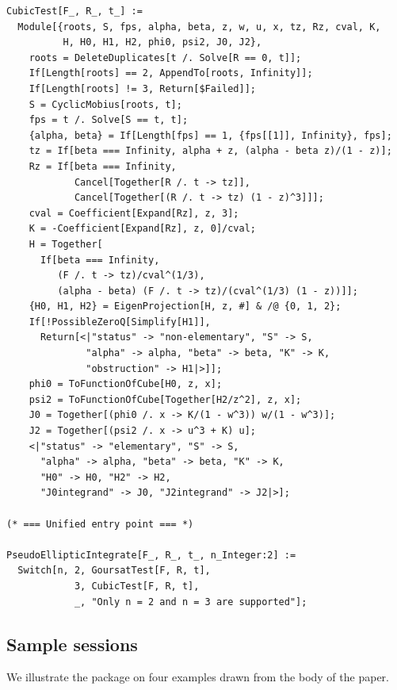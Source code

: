 \documentclass[11pt,a4paper]{article}
\theoremstyle{plain}
\theoremstyle{definition}
\theoremstyle{remark}
\begin{document}
\begin{lstlisting}
CubicTest[F_, R_, t_] :=
  Module[{roots, S, fps, alpha, beta, z, w, u, x, tz, Rz, cval, K,
          H, H0, H1, H2, phi0, psi2, J0, J2},
    roots = DeleteDuplicates[t /. Solve[R == 0, t]];
    If[Length[roots] == 2, AppendTo[roots, Infinity]];
    If[Length[roots] != 3, Return[$Failed]];
    S = CyclicMobius[roots, t];
    fps = t /. Solve[S == t, t];
    {alpha, beta} = If[Length[fps] == 1, {fps[[1]], Infinity}, fps];
    tz = If[beta === Infinity, alpha + z, (alpha - beta z)/(1 - z)];
    Rz = If[beta === Infinity,
            Cancel[Together[R /. t -> tz]],
            Cancel[Together[(R /. t -> tz) (1 - z)^3]]];
    cval = Coefficient[Expand[Rz], z, 3];
    K = -Coefficient[Expand[Rz], z, 0]/cval;
    H = Together[
      If[beta === Infinity,
         (F /. t -> tz)/cval^(1/3),
         (alpha - beta) (F /. t -> tz)/(cval^(1/3) (1 - z))]];
    {H0, H1, H2} = EigenProjection[H, z, #] & /@ {0, 1, 2};
    If[!PossibleZeroQ[Simplify[H1]],
      Return[<|"status" -> "non-elementary", "S" -> S,
              "alpha" -> alpha, "beta" -> beta, "K" -> K,
              "obstruction" -> H1|>]];
    phi0 = ToFunctionOfCube[H0, z, x];
    psi2 = ToFunctionOfCube[Together[H2/z^2], z, x];
    J0 = Together[(phi0 /. x -> K/(1 - w^3)) w/(1 - w^3)];
    J2 = Together[(psi2 /. x -> u^3 + K) u];
    <|"status" -> "elementary", "S" -> S,
      "alpha" -> alpha, "beta" -> beta, "K" -> K,
      "H0" -> H0, "H2" -> H2,
      "J0integrand" -> J0, "J2integrand" -> J2|>];

(* === Unified entry point === *)

PseudoEllipticIntegrate[F_, R_, t_, n_Integer:2] :=
  Switch[n, 2, GoursatTest[F, R, t],
            3, CubicTest[F, R, t],
            _, "Only n = 2 and n = 3 are supported"];
\end{lstlisting}

\subsection*{Sample sessions}

We illustrate the package on four examples drawn from the body of the paper.
\end{document}
